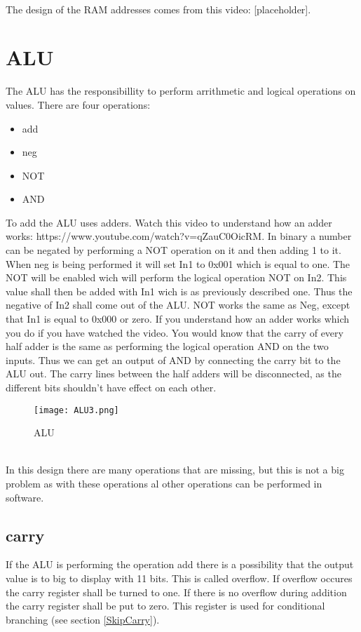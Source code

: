 \documentclass{article}
\newcommand{\adder}{https://www.youtube.com/watch?v=qZauC0OicRM}
\newcommand{\BennysRAM}{[placeholder]}
\begin{document}
~\\
The design of the RAM addresses comes from this video: \BennysRAM.
\section{ALU}
The ALU has the responsibillity to perform arrithmetic and logical operations on values.
There are four operations:
\begin{itemize}
	\item{add}
	\item{neg}
	\item{NOT}
	\item{AND}
\end{itemize}
To add the ALU uses adders. Watch this video to understand how an adder works: \adder. In binary a number can be negated by performing a NOT operation on it and then adding 1 to it. When neg is being performed it will set In1 to 0x001 which is equal to one. The NOT will be enabled wich will perform the logical operation NOT on In2. This value shall then be added with In1 wich is as previously described one. Thus the negative of In2 shall come out of the ALU. NOT works the same as Neg, except that In1 is equal to 0x000 or zero. If you understand how an adder works which you do if you have watched the video. You would know that the carry of every half adder is the same as performing the logical operation AND on the two inputs. Thus we can get an output of AND by connecting the carry bit to the ALU out. The carry lines between the half adders will be disconnected, as the different bits shouldn't have effect on each other.
\begin{figure}[h]
	\texttt{[image: ALU3.png]}	
	\caption{ALU}
\end{figure}

~\\
In this design there are many operations that are missing, but this is not a big problem as with these operations al other operations can be performed in software.
\subsection{carry\label{ALU}}
If the ALU is performing the operation add there is a possibility that the output value is to big to display with 11 bits. This is called overflow. If overflow occures the carry register shall be turned to one. If there is no overflow during addition the carry register shall be put to zero. This register is used for conditional branching (see section  \ref{SkipCarry}).
\end{document}
